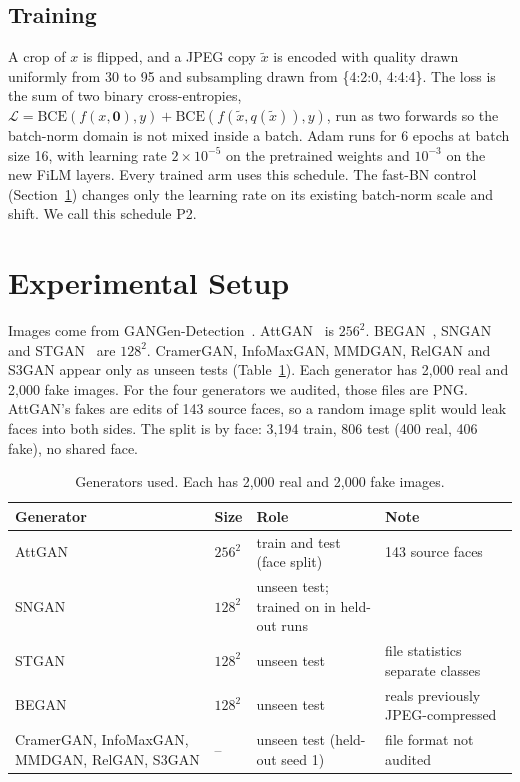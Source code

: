 \documentclass[conference]{IEEEtran}
\begin{document}
\subsection{Training}
\label{sec:train}
A crop of $x$ is flipped, and a JPEG copy $\tilde x$ is encoded with quality drawn uniformly from 30 to 95 and subsampling drawn from \{4:2:0, 4:4:4\}. The loss is the sum of two binary cross-entropies,
$\mathcal{L}=\mathrm{BCE}(f(x,\mathbf 0),y)+\mathrm{BCE}(f(\tilde x,q(\tilde x)),y)$,
run as two forwards so the batch-norm domain is not mixed inside a batch. Adam runs for 6 epochs at batch size 16, with learning rate $2{\times}10^{-5}$ on the pretrained weights and $10^{-3}$ on the new FiLM layers. Every trained arm uses this schedule. The fast-BN control (Section~\ref{sec:setup}) changes only the learning rate on its existing batch-norm scale and shift. We call this schedule P2.

\section{Experimental Setup}
\label{sec:setup}
Images come from GANGen-Detection~\cite{tan2024npr}. AttGAN~\cite{he2019attgan} is $256^2$. BEGAN~\cite{berthelot2017began}, SNGAN~\cite{miyato2018sngan} and STGAN~\cite{liu2019stgan} are $128^2$. CramerGAN, InfoMaxGAN, MMDGAN, RelGAN and S3GAN appear only as unseen tests (Table~\ref{tab:data}). Each generator has 2{,}000 real and 2{,}000 fake images. For the four generators we audited, those files are PNG. AttGAN's fakes are edits of 143 source faces, so a random image split would leak faces into both sides. The split is by face: 3{,}194 train, 806 test (400 real, 406 fake), no shared face.

\begin{table}[t]
\centering
\caption{Generators used. Each has 2{,}000 real and 2{,}000 fake images.}
\label{tab:data}
\setlength{\tabcolsep}{3pt}
\footnotesize
\begin{tabular}{p{1.55cm}p{0.7cm}p{2.3cm}p{2.6cm}}
\toprule
Generator & Size & Role & Note \\
\midrule
AttGAN~\cite{he2019attgan} & $256^2$ & train and test (face split) & 143 source faces \\
SNGAN~\cite{miyato2018sngan} & $128^2$ & unseen test; trained on in held-out runs & \\
STGAN~\cite{liu2019stgan} & $128^2$ & unseen test & file statistics separate classes \\
BEGAN~\cite{berthelot2017began} & $128^2$ & unseen test & reals previously JPEG-compressed \\
CramerGAN, InfoMaxGAN, MMDGAN, RelGAN, S3GAN & -- & unseen test (held-out seed 1) & file format not audited \\
\bottomrule
\end{tabular}
\end{table}
\end{document}
